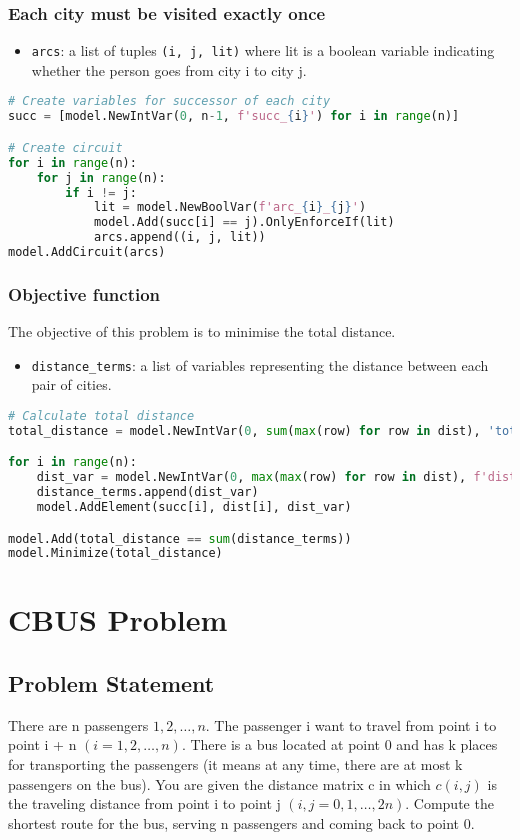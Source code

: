 \documentclass{article}
\begin{document}
\subsubsection{Each city must be visited exactly once}
\begin{itemize}
    \item \verb |arcs|: a list of tuples \verb|(i, j, lit)| where lit is a boolean variable indicating whether the person goes from city i to city j.
\end{itemize}
\pagebreak
\begin{lstlisting}[language=Python]
# Create variables for successor of each city
succ = [model.NewIntVar(0, n-1, f'succ_{i}') for i in range(n)]

# Create circuit
for i in range(n):
    for j in range(n):
        if i != j:
            lit = model.NewBoolVar(f'arc_{i}_{j}')
            model.Add(succ[i] == j).OnlyEnforceIf(lit)
            arcs.append((i, j, lit))
model.AddCircuit(arcs)

\end{lstlisting}

\subsubsection{Objective function}
The objective of this problem is to minimise the total distance.
\begin{itemize}
    \item \verb|distance_terms|: a list of variables representing the distance between each pair of cities.
\end{itemize}
\begin{lstlisting}[language=Python]
# Calculate total distance
total_distance = model.NewIntVar(0, sum(max(row) for row in dist), 'total_distance')

for i in range(n):
    dist_var = model.NewIntVar(0, max(max(row) for row in dist), f'dist_{i}')
    distance_terms.append(dist_var)
    model.AddElement(succ[i], dist[i], dist_var)

model.Add(total_distance == sum(distance_terms))
model.Minimize(total_distance)
\end{lstlisting}
\pagebreak

\section{CBUS Problem}
\subsection{Problem Statement}
There are n passengers $1, 2, \dots, n$. 
The passenger i want to travel from point i to point i + n $(i = 1,2,\dots,n)$. 
There is a bus located at point 0 and has k places for transporting the passengers (it means at any 
time, there are at most k passengers on the bus). You are given the distance 
matrix c in which $c(i,j)$ is the traveling distance from point i to point j 
$(i, j = 0,1, \dots , 2n)$. Compute the shortest route for the bus, serving n passengers 
and coming back to point 0.
\end{document}

